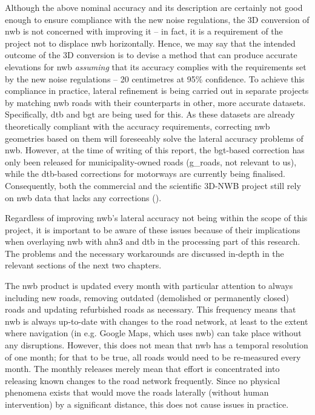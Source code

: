 Although the above nominal accuracy and its description are certainly not good enough to ensure compliance with the new noise regulations, the 3D conversion of \ac{nwb} is not concerned with improving it – in fact, it is a requirement of the project not to displace \ac{nwb} horizontally. Hence, we may say that the intended outcome of the 3D conversion is to devise a method that can produce accurate elevations for \ac{nwb} \textit{assuming} that its accuracy complies with the requirements set by the new noise regulations – 20 centimetres at 95\% confidence. To achieve this compliance in practice, lateral refinement is being carried out in separate projects by matching \ac{nwb} roads with their counterparts in other, more accurate datasets. Specifically, \ac{dtb} and \ac{bgt} are being used for this. As these datasets are already theoretically compliant with the accuracy requirements, correcting \ac{nwb} geometries based on them will foreseeably solve the lateral accuracy problems of \ac{nwb}. However, at the time of writing of this report, the \ac{bgt}-based correction has only been released for municipality-owned roads (\ac{g_roads}, not relevant to us), while the \ac{dtb}-based corrections for motorways are currently being finalised. Consequently, both the commercial and the scientific 3D-NWB project still rely on \ac{nwb} data that lacks any corrections (\cite{nwb_gecorrigeerd}).

Regardless of improving \ac{nwb}’s lateral accuracy not being within the scope of this project, it is important to be aware of these issues because of their implications when overlaying \ac{nwb} with \ac{ahn3} and \ac{dtb} in the processing part of this research. The problems and the necessary workarounds are discussed in-depth in the relevant sections of the next two chapters.

The \ac{nwb} product is updated every month with particular attention to always including new roads, removing outdated (demolished or permanently closed) roads and updating refurbished roads as necessary. This frequency means that \ac{nwb} is always up-to-date with changes to the road network, at least to the extent where navigation (in e.g. Google Maps, which uses \ac{nwb}) can take place without any disruptions. However, this does not mean that \ac{nwb} has a temporal resolution of one month; for that to be true, all roads would need to be re-measured every month. The monthly releases merely mean that effort is concentrated into releasing known changes to the road network frequently. Since no physical phenomena exists that would move the roads laterally (without human intervention) by a significant distance, this does not cause issues in practice.

